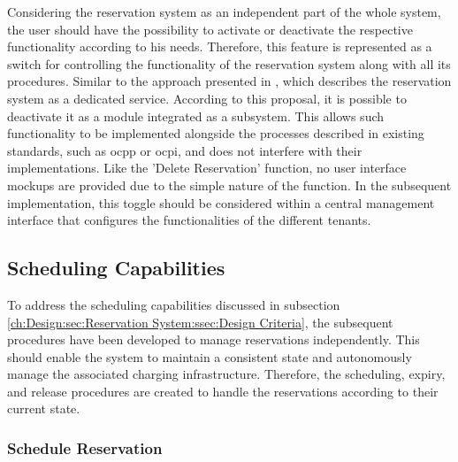 Considering the reservation system as an independent part of the whole system, the user should have the possibility to activate or deactivate the respective functionality according to his needs.
Therefore, this feature is represented as a switch for controlling the functionality of the reservation system along with all its procedures. Similar to the approach presented in \cite{orcioni_ev_2020}, which describes the reservation system as a dedicated service. According to this proposal, it is possible to deactivate it as a module integrated as a subsystem.
This allows such functionality to be implemented alongside the processes described in existing standards, such as \acrshort{ocpp} or \acrshort{ocpi}, and does not interfere with their implementations.
Like the 'Delete Reservation' function, no user interface mockups are provided due to the simple nature of the function. In the subsequent implementation, this toggle should be considered within a central management interface that configures the functionalities of the different tenants. 

\newpage

\subsection{Scheduling Capabilities}
\label{ch:Design:sec:Reservation System:ssec:Scheduling Capabilities}

To address the scheduling capabilities discussed in subsection \ref{ch:Design:sec:Reservation System:ssec:Design Criteria}, the subsequent procedures have been developed to manage reservations independently.
This should enable the system to maintain a consistent state and autonomously manage the associated charging infrastructure.
Therefore, the scheduling, expiry, and release procedures are created to handle the reservations according to their current state.

\subsubsection{Schedule Reservation}
\label{ch:Design:sec:Reservation System:ssec:Scheduling Capabilities:sssec:Schedule Reservation}

